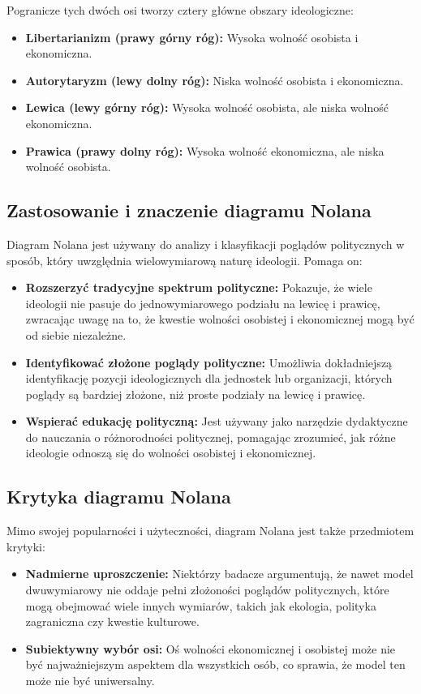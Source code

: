 Pogranicze tych dwóch osi tworzy cztery główne obszary ideologiczne:
\begin{itemize}
      \item \textbf{Libertarianizm (prawy górny róg):} Wysoka wolność osobista i ekonomiczna.
      \item \textbf{Autorytaryzm (lewy dolny róg):} Niska wolność osobista i ekonomiczna.
      \item \textbf{Lewica (lewy górny róg):} Wysoka wolność osobista, ale niska wolność ekonomiczna.
      \item \textbf{Prawica (prawy dolny róg):} Wysoka wolność ekonomiczna, ale niska wolność osobista.
\end{itemize}

\subsection{Zastosowanie i znaczenie diagramu Nolana}
Diagram Nolana jest używany do analizy i klasyfikacji poglądów politycznych w sposób, który uwzględnia wielowymiarową naturę ideologii. Pomaga on:

\begin{itemize}
      \item \textbf{Rozszerzyć tradycyjne spektrum polityczne:} Pokazuje, że wiele ideologii nie pasuje do jednowymiarowego podziału na lewicę i prawicę,
            zwracając uwagę na to, że kwestie wolności osobistej i ekonomicznej mogą być od siebie niezależne.
      \item \textbf{Identyfikować złożone poglądy polityczne:} Umożliwia dokładniejszą \\ identyfikację pozycji ideologicznych dla jednostek lub organizacji,
            których poglądy są bardziej złożone, niż proste podziały na lewicę i prawicę.
      \item \textbf{Wspierać edukację polityczną:} Jest używany jako narzędzie dydaktyczne do nauczania o różnorodności politycznej, pomagając zrozumieć,
            jak różne ideologie odnoszą się do wolności osobistej i ekonomicznej.
\end{itemize}

\subsection{Krytyka diagramu Nolana}
Mimo swojej popularności i użyteczności, diagram Nolana jest także przedmiotem krytyki:
\begin{itemize}
      \item \textbf{Nadmierne uproszczenie:} Niektórzy badacze argumentują, że nawet model dwuwymiarowy nie oddaje pełni złożoności poglądów politycznych,
            które mogą obejmować wiele innych wymiarów, takich jak ekologia, polityka zagraniczna czy kwestie kulturowe.
      \item \textbf{Subiektywny wybór osi:} Oś wolności ekonomicznej i osobistej może nie być najważniejszym aspektem dla wszystkich osób, co sprawia, że model ten może nie być uniwersalny.
\end{itemize}

